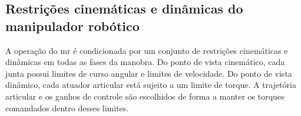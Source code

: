 \subsection{Restrições cinemáticas e dinâmicas do manipulador robótico}
\label{sec:restricoes_MR}

A operação do \gls{mr} é condicionada por um conjunto de restrições cinemáticas e dinâmicas em todas as fases da manobra. 
Do ponto de vista cinemático, cada junta possui limites de curso angular e limites de velocidade.
Do ponto de vista dinâmico, cada atuador articular está sujeito a um limite de torque.
A trajetória articular e os ganhos de controle são escolhidos de forma a manter os torques comandados dentro desses limites.

